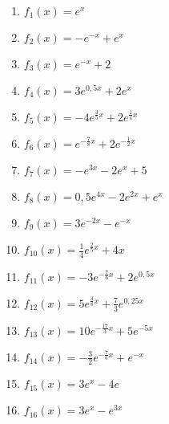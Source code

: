 	\begin{Exercise}[title={\raggedright Berechne jeweils allgemein die Ableitung \(f'(x)\)}, label=efktAblA1]

		\begin{minipage}{\textwidth}
			\begin{minipage}{0.5\textwidth}
				\begin{enumerate}[label=\alph*)]
					\item \(f_1(x)=e^x\)
					\item \(f_2(x)=-e^{-x}+e^x\)
					\item \(f_3(x)=e^{-x}+2\)
					\item \(f_4(x)=3e^{0,5x}+2e^x\)
					\item \(f_5(x)=-4e^{\frac{3}{5}x}+2e^{\frac{1}{4}x}\)
					\item \(f_6(x)=e^{-\frac{7}{8}x}+2e^{-\frac{1}{2}x}\)
					\item \(f_7(x)=-e^{3x}-2e^{x}+5\)
					\item \(f_8(x)=0,5e^{4x}-2e^{2x}+e^x\)
				\end{enumerate}
			\end{minipage}%
			\begin{minipage}{0.5\textwidth}
				\begin{enumerate}[label=\alph*)]
					\setcounter{enumi}{8}
					\item \(f_9(x)=3e^{-2x}-e^{-x}\)
					\item \(f_{10}(x)=\frac{1}{4}e^{\frac{2}{5}x}+4x\)
					\item \(f_{11}(x)=-3e^{-\frac{7}{6}x}+2e^{0,5x}\)
					\item \(f_{12}(x)=5e^{\frac{3}{8}x}+\frac{7}{3}e^{0,25x}\)
					\item \(f_{13}(x)=10e^{-\frac{17}{3}x}+5e^{-5x}\)
					\item \(f_{14}(x)=-\frac{3}{2}e^{-\frac{7}{6}x}+e^{-x}\)
					\item \(f_{15}(x)=3e^x-4e\)
					\item \(f_{16}(x)=3e^x-e^{3x}\)
				\end{enumerate}
			\end{minipage}%
		\end{minipage}
	\end{Exercise}
